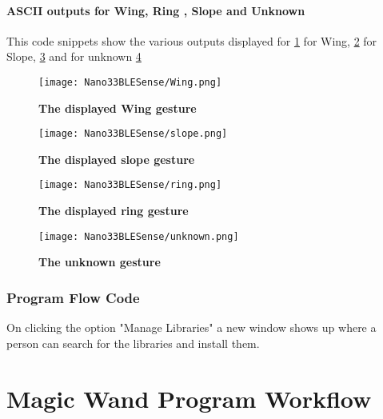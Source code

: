 \subsubsection{ASCII outputs for Wing, Ring , Slope and Unknown}

This code snippets show the various outputs displayed for \ref{wing} for Wing, \ref{slope} for Slope, \ref{ring} and for unknown \ref{unknown} 
\begin{figure}[h!]
    \texttt{[image: Nano33BLESense/Wing.png]}
    \caption{\textbf{The displayed Wing gesture}}
    \label{wing}
\end{figure}

\begin{figure}[h!]
    \texttt{[image: Nano33BLESense/slope.png]}
    \caption{\textbf{The displayed slope gesture}}
    \label{slope}
\end{figure}

\begin{figure}[h!]
    \texttt{[image: Nano33BLESense/ring.png]}
    \caption{\textbf{The displayed ring gesture}}
    \label{ring}
\end{figure}

\begin{figure}[h!]
    \texttt{[image: Nano33BLESense/unknown.png]}
    \caption{\textbf{The unknown gesture}}
    \label{unknown}
\end{figure}










\bigskip
\newpage







\subsection{Program Flow Code}

On clicking the option "Manage Libraries" a new window shows up where a person can search for the libraries and install them.

\chapter{Magic Wand Program Workflow}



